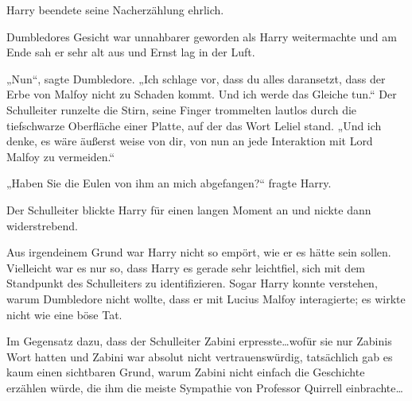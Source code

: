 Harry beendete seine Nacherzählung ehrlich.

Dumbledores Gesicht war unnahbarer geworden als Harry weitermachte und am Ende sah er sehr alt aus und Ernst lag in der Luft.

„Nun“, sagte Dumbledore. „Ich schlage vor, dass du alles daransetzt, dass der Erbe von Malfoy nicht zu Schaden kommt. Und ich werde das Gleiche tun.“ Der Schulleiter runzelte die Stirn, seine Finger trommelten lautlos durch die tiefschwarze Oberfläche einer Platte, auf der das Wort Leliel stand. „Und ich denke, es wäre äußerst weise von dir, von nun an jede Interaktion mit Lord Malfoy zu vermeiden.“

„Haben Sie die Eulen von ihm an mich abgefangen?“ fragte Harry.

Der Schulleiter blickte Harry für einen langen Moment an und nickte dann widerstrebend.

Aus irgendeinem Grund war Harry nicht so empört, wie er es hätte sein sollen. Vielleicht war es nur so, dass Harry es gerade sehr leichtfiel, sich mit dem Standpunkt des Schulleiters zu identifizieren. Sogar Harry konnte verstehen, warum Dumbledore nicht wollte, dass er mit Lucius Malfoy interagierte; es wirkte nicht wie eine böse Tat.

Im Gegensatz dazu, dass der Schulleiter Zabini erpresste…wofür sie nur Zabinis Wort hatten und Zabini war absolut nicht vertrauenswürdig, tatsächlich gab es kaum einen sichtbaren Grund, warum Zabini nicht einfach die Geschichte erzählen würde, die ihm die meiste Sympathie von Professor Quirrell einbrachte…

